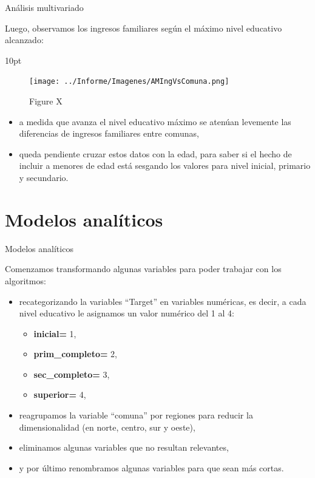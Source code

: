 \documentclass[pdf]{beamer}
\def\vspace{}%
\begin{document}
\begin{frame}{Análisis multivariado}

    Luego, observamos los ingresos familiares según el máximo nivel educativo alcanzado:

    \begin{minipage}{0.55\textwidth}
        \vspace{10pt}
        \begin{figure} 
        \texttt{[image: ../Informe/Imagenes/AMIngVsComuna.png]}
        \caption{Figure X}
        \end{figure}
    \end{minipage}
    \begin{minipage}{0.38\textwidth}
        \begin{itemize}
            \justifying
            \item a medida que avanza el nivel educativo máximo se atenúan levemente las diferencias de ingresos familiares entre comunas,
            \item queda pendiente cruzar estos datos con la edad, para saber si el hecho de incluir a menores de edad está sesgando los valores para nivel inicial, primario y secundario.
        \end{itemize}
    \end{minipage}

\end{frame}

\section{Modelos analíticos}

\begin{frame}{Modelos analíticos}

    Comenzamos transformando algunas variables para poder trabajar con los algoritmos:
    \begin{itemize}
        \item recategorizando la variables ``Target'' en variables numéricas, es decir, a cada nivel educativo le asignamos un valor numérico del 1 al 4:
        \begin{itemize}
            \item \textbf{inicial=} 1,
            \item \textbf{prim\_completo=} 2,
            \item \textbf{sec\_completo=} 3,
            \item \textbf{superior=} 4,
        \end{itemize}
        \item reagrupamos la variable ``comuna'' por regiones para reducir la dimensionalidad (en norte, centro, sur y oeste),
        \item eliminamos algunas variables que no resultan relevantes, 
        \item y por último renombramos algunas variables para que sean más cortas.
    \end{itemize}
    
\end{frame}
\end{document}
